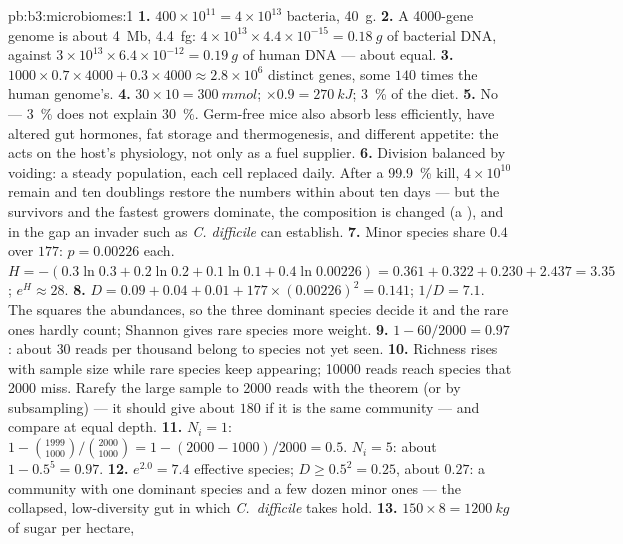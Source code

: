 \begin{solution}{pb:b3:microbiomes:1}
\textbf{1.} $400\times 10^{11} = 4\times 10^{13}$ bacteria, \qty{40}{g}.
\textbf{2.} A \num{4000}-gene genome is about \qty{4}{Mb}, \qty{4.4}{fg}:
$4\times 10^{13}\times 4.4\times 10^{-15} = \qty{0.18}{g}$ of bacterial
DNA, against $3\times 10^{13}\times 6.4\times 10^{-12} = \qty{0.19}{g}$
of human DNA --- about equal.
\textbf{3.} $1000\times 0.7\times 4000 + 0.3\times 4000 \approx 2.8\times
10^{6}$ distinct genes, some $140$ times the human genome's.
\textbf{4.} $30\times 10 = \qty{300}{mmol}$; $\times 0.9 = \qty{270}{kJ}$;
\qty{3}{\%} of the diet.
\textbf{5.} No --- \qty{3}{\%} does not explain \qty{30}{\%}. Germ-free
mice also absorb less efficiently, have altered gut hormones, fat
storage and thermogenesis, and different appetite: the  acts
on the host's physiology, not only as a fuel supplier.
\textbf{6.} Division balanced by voiding: a steady population, each cell
replaced daily. After a \qty{99.9}{\%} kill, $4\times 10^{10}$ remain
and ten doublings restore the numbers within about ten days --- but
the survivors and the fastest growers dominate, the composition is
changed (a ), and in the gap an invader such as \emph{C.
difficile} can establish.
\textbf{7.} Minor species share $0.4$ over $177$: $p = 0.00226$ each. $H
= -(0.3\ln 0.3 + 0.2\ln 0.2 + 0.1\ln 0.1 + 0.4\ln 0.00226) = 0.361 +
0.322 + 0.230 + 2.437 = 3.35$; $e^{H} \approx 28$.
\textbf{8.} $D = 0.09 + 0.04 + 0.01 + 177\times (0.00226)^{2} = 0.141$;
$1/D = 7.1$. The  squares the abundances, so the three
dominant species decide it and the rare ones hardly count; Shannon
gives rare species more weight.
\textbf{9.} $1 - 60/2000 = 0.97$: about $30$ reads per thousand belong
to species not yet seen.
\textbf{10.} Richness rises with sample size while rare species keep
appearing; \num{10000} reads reach species that \num{2000} miss. Rarefy
the large sample to \num{2000} reads with the theorem (or by
subsampling) --- it should give about $180$ if it is the same
community --- and compare at equal depth.
\textbf{11.} $N_{i} = 1$: $1 - \binom{1999}{1000}/\binom{2000}{1000} =
1 - (2000 - 1000)/2000 = 0.5$. $N_{i} = 5$: about $1 - 0.5^{5} = 0.97$.
\textbf{12.} $e^{2.0} = 7.4$ effective species; $D \ge 0.5^{2} = 0.25$,
about $0.27$: a community with one dominant species and a few dozen
minor ones --- the collapsed, low-diversity gut in which
\emph{C.~difficile} takes hold.
\textbf{13.} $150\times 8 = \qty{1200}{kg}$ of sugar per hectare,

\end{solution}
